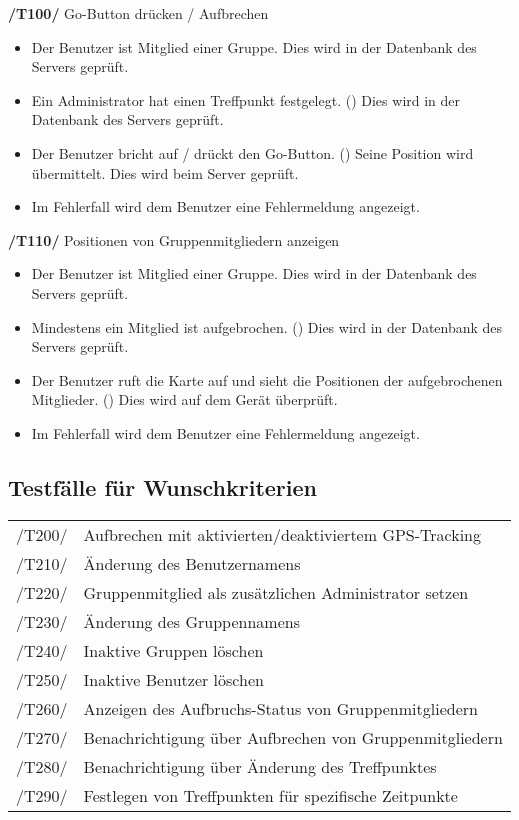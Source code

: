 \textbf{/T100/} Go-Button drücken / Aufbrechen \\ %
\begin{itemize}
\setlength{\itemsep}{0pt}
\item Der Benutzer ist Mitglied einer Gruppe. Dies wird in der Datenbank des Servers geprüft.
\item Ein Administrator hat einen Treffpunkt festgelegt. () Dies wird in der Datenbank des Servers geprüft.
\item Der Benutzer bricht auf / drückt den Go-Button. ()
Seine Position wird übermittelt.
Dies wird beim Server geprüft.
\item Im Fehlerfall wird dem Benutzer eine Fehlermeldung angezeigt.
\end{itemize}


\textbf{/T110/} Positionen von Gruppenmitgliedern anzeigen \\
\begin{itemize}
\setlength{\itemsep}{0pt}
\item Der Benutzer ist Mitglied einer Gruppe. Dies wird in der Datenbank des Servers geprüft.
\item Mindestens ein Mitglied ist aufgebrochen. () Dies wird in der Datenbank des Servers geprüft.
\item Der Benutzer ruft die Karte auf und sieht die Positionen der
aufgebrochenen Mitglieder. () Dies wird auf dem Gerät überprüft.
\item Im Fehlerfall wird dem Benutzer eine Fehlermeldung angezeigt.
\end{itemize}



\subsection{Testfälle für Wunschkriterien}
\begin{tabular}{ll}
/T200/ & Aufbrechen mit aktivierten/deaktiviertem GPS-Tracking \\ %
/T210/ & Änderung des Benutzernamens \\
/T220/ & Gruppenmitglied als zusätzlichen Administrator setzen \\
/T230/ & Änderung des Gruppennamens \\
/T240/ & Inaktive Gruppen löschen \\
/T250/ & Inaktive Benutzer löschen \\
/T260/ & Anzeigen des Aufbruchs-Status von Gruppenmitgliedern \\
/T270/ & Benachrichtigung über Aufbrechen von Gruppenmitgliedern \\
/T280/ & Benachrichtigung über Änderung des Treffpunktes \\
/T290/ & Festlegen von Treffpunkten für spezifische Zeitpunkte \\
\end{tabular}
